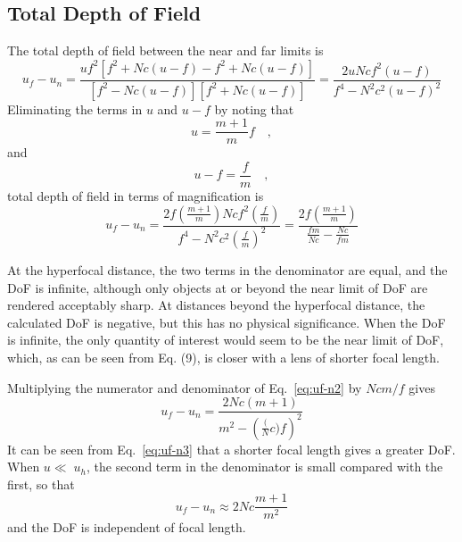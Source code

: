 \documentclass[11pt, oneside]{scrartcl}   	%
\begin{document}
\subsection{Total Depth of Field}

The total depth of field between the near and far limits is
\begin{equation}
     u_f-u_n = \frac{uf^2 \left[f^2 +Nc(u- f)- f^2 +Nc(u-f)\right]}{\left[f^2 -Nc(u-f)\right]\left[f^2 +Nc(u-f)\right]} = 
     \frac{ 2uNcf^2 (u- f)}{f^4 -N^2c^2(u-f)^2}
   \label{eq:uf-n1}
\end{equation}
Eliminating the terms in $u$ and $u - f$ by noting that 
\begin{equation}
u = \frac{m+1}m f\quad ,
\end{equation}
and
\begin{equation}
    u-f = \frac f m\quad,
\end{equation}
total depth of field in terms of magnification is
\begin{equation}
u_f-u_n = \frac{2f\left(\frac{m+1}m\right)Ncf^2\left(\frac f m\right)}{f^4 -N^2c^2\left(\frac f m\right)^2} = \frac{2f\left(\frac{m+1}m\right)}{\frac{fm}{Nc}-\frac{Nc}{fm}}
\label{eq:uf-n2}
\end{equation}

At the hyperfocal distance, the two terms in the denominator are equal, and the DoF is infinite, although only objects at or beyond the near limit of DoF are rendered acceptably sharp. At distances beyond the hyperfocal distance, the calculated DoF is negative, but this has no physical significance. When the DoF is infinite, the only quantity of interest would seem to be the near limit of DoF, which, as can be seen from Eq. (9), is closer with a lens of shorter focal length.

Multiplying the numerator and denominator of Eq.~\ref{eq:uf-n2} by $Ncm/f$
gives
\begin{equation}
   u_f-u_n = \frac{2Nc(m+1)}{m^2-\left(\frac(Nc)f\right)^2}
      \label{eq:uf-n3}

\end{equation}
It can be seen from Eq.~\ref{eq:uf-n3} that a shorter focal length gives a greater DoF. When $u\ll 􏰀 u_h$, the second term in the denominator is small compared with the first, so that
\begin{equation}
   u_f-u_n \approx 2Nc\frac{m+1}{m^2}
   \label{eq:uf-n4}
\end{equation}
and the DoF is independent of focal length.
\end{document}
